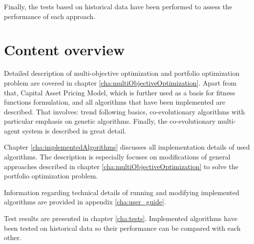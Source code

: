 Finally, the tests based on historical data have been performed to assess the performance of each approach.


\section{Content overview}
\label{sec:zawartoscPracy}

Detailed description of multi-objective optimization and portfolio optimization problem are covered in chapter \ref{cha:multiObjectiveOptimization}.
Apart from that, Capital Asset Pricing Model, which is further used as a basis for fitness functions formulation, and all algorithms that have been implemented are described.
That involves: trend following basics, co-evolutionary algorithms with particular emphasis on genetic algorithms.
Finally, the co-evolutionary multi-agent system is described in great detail.

Chapter \ref{cha:implementedAlgorithms} discusses all implementation details of used algorithms.
The description is especially focuses on modifications of general approaches described in chapter \ref{cha:multiObjectiveOptimization} to solve the portfolio optimization problem.

Information regarding technical details of running and modifying implemented algorithms are provided in appendix \ref{cha:user_guide}.

Test results are presented in chapter \ref{cha:tests}. 
Implemented algorithms have been tested on historical data so their performance can be compared with each other.












